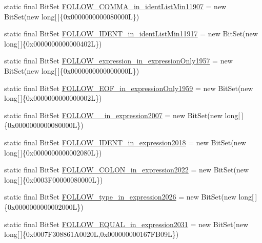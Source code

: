 \begin{DoxyCompactItemize}
\item 
static final Bit\-Set \hyperlink{classorg_1_1tzi_1_1use_1_1parser_1_1soil_1_1_soil_parser_a2ef45c554ecd7067b3eff1a2cdb951af}{F\-O\-L\-L\-O\-W\-\_\-\-C\-O\-M\-M\-A\-\_\-in\-\_\-ident\-List\-Min11907} = new Bit\-Set(new long\mbox{[}$\,$\mbox{]}\{0x0000000000080000\-L\})
\item 
static final Bit\-Set \hyperlink{classorg_1_1tzi_1_1use_1_1parser_1_1soil_1_1_soil_parser_ac84c8c7ecf4580ac9270d7aebc18caa7}{F\-O\-L\-L\-O\-W\-\_\-\-I\-D\-E\-N\-T\-\_\-in\-\_\-ident\-List\-Min11917} = new Bit\-Set(new long\mbox{[}$\,$\mbox{]}\{0x0000000000000402\-L\})
\item 
static final Bit\-Set \hyperlink{classorg_1_1tzi_1_1use_1_1parser_1_1soil_1_1_soil_parser_a44e7046b5431216ac507f3865667d6b3}{F\-O\-L\-L\-O\-W\-\_\-expression\-\_\-in\-\_\-expression\-Only1957} = new Bit\-Set(new long\mbox{[}$\,$\mbox{]}\{0x0000000000000000\-L\})
\item 
static final Bit\-Set \hyperlink{classorg_1_1tzi_1_1use_1_1parser_1_1soil_1_1_soil_parser_ac92fbe14fc934e678fc5a7c62eff806e}{F\-O\-L\-L\-O\-W\-\_\-\-E\-O\-F\-\_\-in\-\_\-expression\-Only1959} = new Bit\-Set(new long\mbox{[}$\,$\mbox{]}\{0x0000000000000002\-L\})
\item 
static final Bit\-Set \hyperlink{classorg_1_1tzi_1_1use_1_1parser_1_1soil_1_1_soil_parser_a746c77fb7ab497ffeec88a478aee4a4f}{F\-O\-L\-L\-O\-W\-\_\-\_\-in\-\_\-expression2007} = new Bit\-Set(new long\mbox{[}$\,$\mbox{]}\{0x0000000000080000\-L\})
\item 
static final Bit\-Set \hyperlink{classorg_1_1tzi_1_1use_1_1parser_1_1soil_1_1_soil_parser_ae39c9ff2ccabf0c37a17ac4f2ca66f7e}{F\-O\-L\-L\-O\-W\-\_\-\-I\-D\-E\-N\-T\-\_\-in\-\_\-expression2018} = new Bit\-Set(new long\mbox{[}$\,$\mbox{]}\{0x0000000000002080\-L\})
\item 
static final Bit\-Set \hyperlink{classorg_1_1tzi_1_1use_1_1parser_1_1soil_1_1_soil_parser_aa5c96098b74c3424cb19e9c412145ad4}{F\-O\-L\-L\-O\-W\-\_\-\-C\-O\-L\-O\-N\-\_\-in\-\_\-expression2022} = new Bit\-Set(new long\mbox{[}$\,$\mbox{]}\{0x0003\-F00000080000\-L\})
\item 
static final Bit\-Set \hyperlink{classorg_1_1tzi_1_1use_1_1parser_1_1soil_1_1_soil_parser_a4fbca1ce16a4e3ffc8601e26056b4499}{F\-O\-L\-L\-O\-W\-\_\-type\-\_\-in\-\_\-expression2026} = new Bit\-Set(new long\mbox{[}$\,$\mbox{]}\{0x0000000000002000\-L\})
\item 
static final Bit\-Set \hyperlink{classorg_1_1tzi_1_1use_1_1parser_1_1soil_1_1_soil_parser_ab29d3d66ca2496729c63892990010096}{F\-O\-L\-L\-O\-W\-\_\-\-E\-Q\-U\-A\-L\-\_\-in\-\_\-expression2031} = new Bit\-Set(new long\mbox{[}$\,$\mbox{]}\{0x0007\-F308861\-A0020\-L,0x000000000167\-F\-B09\-L\})

\end{DoxyCompactItemize}
